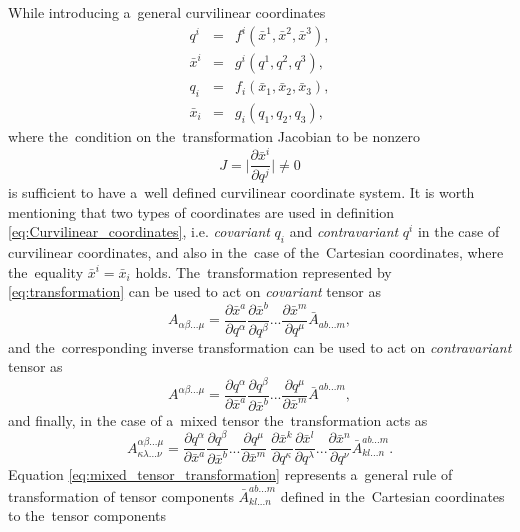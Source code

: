 \documentclass[review]{elsarticle}
\newcommand{\pdv}[2]{\frac{\partial{#1}}{\partial{#2}}}
\begin{document}
While introducing a~general curvilinear coordinates
\begin{eqnarray}
  q^i &=& f^i(\bar{x}^1, \bar{x}^2, \bar{x}^3) , \nonumber \\
  \bar{x}^i &=& g^i(q^1, q^2, q^3) , \nonumber \\
  q_i &=& f_i(\bar{x}_1, \bar{x}_2, \bar{x}_3) , \nonumber \\
  \bar{x}_i &=& g_i(q_1, q_2, q_3) , 
  \label{eq:Curvilinear_coordinates} 
\end{eqnarray}
where the~condition on the~transformation Jacobian to be nonzero
\begin{equation}
  J = \bigg| \pdv{\bar{x}^i}{q^j}\bigg| \neq 0
  \label{eq:transformation}
\end{equation}
is sufficient to have a~well defined curvilinear coordinate system.
It is worth mentioning that two types of coordinates are used in definition
\eqref{eq:Curvilinear_coordinates}, i.e. \textit{covariant} $q_i$ and 
\textit{contravariant} $q^i$ in the case of curvilinear coordinates, and
also in the~case of the~Cartesian coordinates, where the~equality 
$\bar{x}^i = \bar{x}_i$  
holds. The~transformation represented by \eqref{eq:transformation} can be
used to act on \textit{covariant} tensor as
\begin{equation}
  A_{\alpha\beta...\mu} = \pdv{\bar{x}^a}{q^\alpha} \pdv{\bar{x}^b}{q^\beta} ...
  \pdv{\bar{x}^m}{q^\mu} \bar{A}_{ab...m} ,
  \label{eq:covariant_tensor_transformation}
\end{equation}
and the~corresponding inverse transformation can be
used to act on \textit{contravariant} tensor as
\begin{equation}
  A^{\alpha\beta...\mu} = \pdv{q^\alpha}{\bar{x}^a} \pdv{q^\beta}{\bar{x}^b} ...
  \pdv{q^\mu}{\bar{x}^m} \bar{A}^{ab...m} ,
  \label{eq:contravariant_tensor_transformation}
\end{equation}
and finally, in the case of a~mixed tensor the~transformation acts as
\begin{equation}
  A^{\alpha\beta...\mu}_{\kappa\lambda...\nu}  = 
  \pdv{q^\alpha}{\bar{x}^a} \pdv{q^\beta}{\bar{x}^b} ...
  \pdv{q^\mu}{\bar{x}^m}~
  \pdv{\bar{x}^k}{q^\kappa} \pdv{\bar{x}^l}{q^\lambda} ...
  \pdv{\bar{x}^n}{q^\nu} 
  \bar{A}^{ab...m}_{kl...n}.
  \label{eq:mixed_tensor_transformation}
\end{equation}
Equation \eqref{eq:mixed_tensor_transformation} represents a~general rule of
transformation of tensor components $\bar{A}^{ab...m}_{kl...n}$ defined in
the~Cartesian coordinates to the~tensor components 
\end{document}
